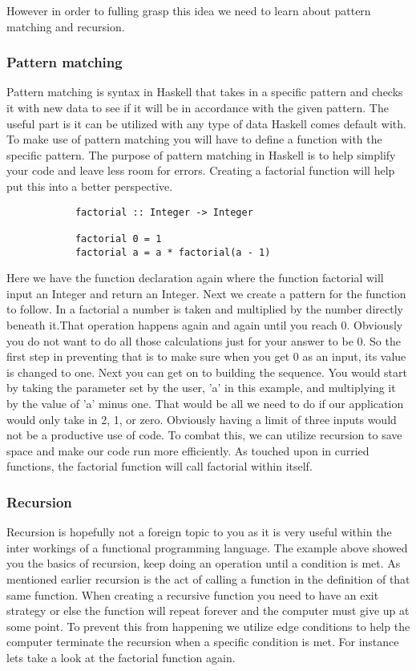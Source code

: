 \documentclass{article}
\begin{document}
    \noindent However in order to fulling grasp this idea we need to learn about pattern matching and recursion.
        
        \subsubsection{Pattern matching}
        Pattern matching is syntax in Haskell that takes in a specific pattern and checks it with new data to see if it will be in accordance with the given pattern. The useful part is it can be utilized with any type of data Haskell comes default with. To make use of pattern matching you will have to define a function with the specific pattern. The purpose of pattern matching in Haskell is to help simplify your code and leave less room for errors. Creating a factorial function will help put this into a better perspective. 
        
        \begin{lstlisting}
            factorial :: Integer -> Integer 
            
            factorial 0 = 1
            factorial a = a * factorial(a - 1)
        \end{lstlisting}
        
        \noindent Here we have the function declaration again where the function factorial will input an Integer and return an Integer. Next we create a pattern for the function to follow. In a factorial a number is taken and multiplied by the number directly beneath it.That operation happens again and again until you reach 0. Obviously you do not want to do all those calculations just for your answer to be 0. So the first step in preventing that is to make sure when you get 0 as an input, its value is changed to one. Next you can get on to building the sequence. You would start by taking the parameter set by the user, 'a' in this example, and multiplying it by the value of 'a' minus one. That would be all we need to do if our application would only take in 2, 1, or zero. Obviously having a limit of three inputs would not be a productive use of code. To combat this, we can utilize recursion to save space and make our code run more efficiently. As touched upon in curried functions, the factorial function will call factorial within itself. 
        
        \subsubsection{Recursion}
        Recursion is hopefully not a foreign topic to you as it is very useful within the inter workings of a functional programming language. The example above showed you the basics of recursion, keep doing an operation until a condition is met. As mentioned earlier recursion is the act of calling a function in the definition of that same function. When creating a recursive function you need to have an exit strategy or else the function will repeat forever and the computer must give up at some point. To prevent this from happening we utilize edge conditions to help the computer terminate the recursion when a specific condition is met. For instance lets take a look at the factorial function again.
        
\end{document}
